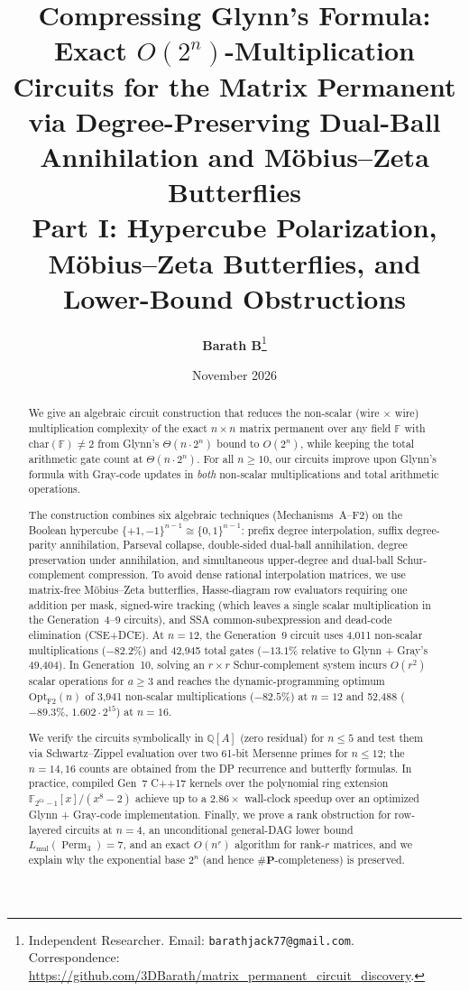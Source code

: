 \documentclass[11pt,a4paper]{article}
\title{\textbf{Compressing Glynn's Formula: \\ Exact $O(2^n)$-Multiplication Circuits for the Matrix Permanent via Degree-Preserving Dual-Ball Annihilation and M\"obius--Zeta Butterflies}\\[0.4em]
\large\textsf{Part I: Hypercube Polarization, M\"obius--Zeta Butterflies, and Lower-Bound Obstructions}}
\author{
    \textbf{Barath B}\thanks{Independent Researcher. Email: \texttt{barathjack77@gmail.com}.\\Correspondence: \url{https://github.com/3DBarath/matrix_permanent_circuit_discovery}.}
}
\date{November 2026}
\newcommand{\Perm}{\operatorname{Perm}}
\begin{document}
\maketitle

\begin{abstract}
We give an algebraic circuit construction that reduces the non-scalar (wire $\times$ wire) multiplication complexity of the exact $n \times n$ matrix permanent over any field $\mathbb{F}$ with $\mathrm{char}(\mathbb{F}) \neq 2$ from Glynn's $\Theta(n \cdot 2^n)$ bound to $O(2^n)$, while keeping the total arithmetic gate count at $\Theta(n \cdot 2^n)$. For all $n \ge 10$, our circuits improve upon Glynn's formula with Gray-code updates in \emph{both} non-scalar multiplications and total arithmetic operations.

The construction combines six algebraic techniques (Mechanisms~A--F2) on the Boolean hypercube $\{+1,-1\}^{n-1} \cong \{0,1\}^{n-1}$: prefix degree interpolation, suffix degree-parity annihilation, Parseval collapse, double-sided dual-ball annihilation, degree preservation under annihilation, and simultaneous upper-degree and dual-ball Schur-complement compression. To avoid dense rational interpolation matrices, we use matrix-free M\"obius--Zeta butterflies, Hasse-diagram row evaluators requiring one addition per mask, signed-wire tracking (which leaves a single scalar multiplication in the Generation~4--9 circuits), and SSA common-subexpression and dead-code elimination (CSE+DCE). At $n = 12$, the Generation~9 circuit uses 4,011 non-scalar multiplications ($-82.2\%$) and 42,945 total gates ($-13.1\%$ relative to Glynn + Gray's 49,404). In Generation~10, solving an $r \times r$ Schur-complement system incurs $O(r^2)$ scalar operations for $a \ge 3$ and reaches the dynamic-programming optimum $\mathrm{Opt}_{\mathrm{F2}}(n)$ of 3,941 non-scalar multiplications ($-82.5\%$) at $n = 12$ and 52,488 ($-89.3\%$, $1.602 \cdot 2^{15}$) at $n = 16$.

We verify the circuits symbolically in $\mathbb{Q}[A]$ (zero residual) for $n \le 5$ and test them via Schwartz--Zippel evaluation over two 61-bit Mersenne primes for $n \le 12$; the $n = 14, 16$ counts are obtained from the DP recurrence and butterfly formulas. In practice, compiled Gen~7 C++17 kernels over the polynomial ring extension $\mathbb{F}_{2^{61}-1}[x]/(x^8 - 2)$ achieve up to a $2.86\times$ wall-clock speedup over an optimized Glynn + Gray-code implementation. Finally, we prove a rank obstruction for row-layered circuits at $n = 4$, an unconditional general-DAG lower bound $L_{\mathrm{mul}}(\Perm_3) = 7$, and an exact $O(n^r)$ algorithm for rank-$r$ matrices, and we explain why the exponential base $2^n$ (and hence $\#\mathbf{P}$-completeness) is preserved.
\end{abstract}
\end{document}
